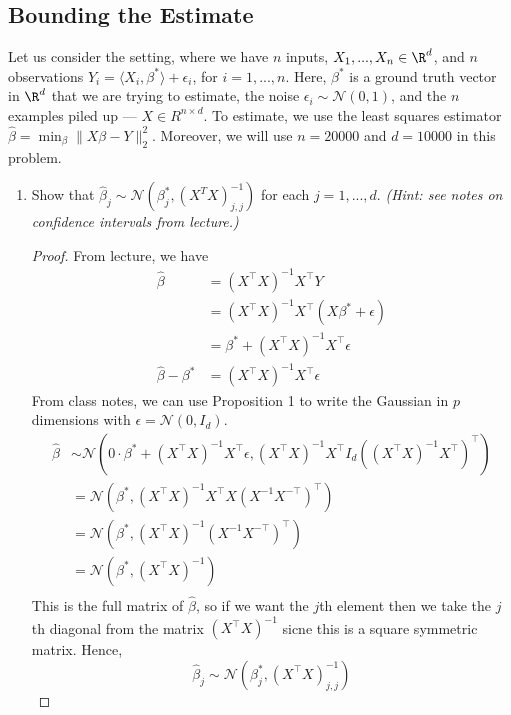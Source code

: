 \documentclass[shortlabels]{article}
\begin{document}
\subsection*{Bounding the Estimate} 
\begin{bprob}
    Let us consider the setting, where we have $n$ inputs, $X_1, ..., X_n \in \R^d$, and $n$ observations $Y_i = \langle X_i, \beta^* \rangle + \epsilon_i$, for $i = 1, ..., n$. Here, $\beta^*$ is a ground truth vector in $\R^d$ that we are trying to estimate, the noise $\epsilon_i \sim \mathcal{N}(0, 1)$, and the $n$ examples piled up --- $X \in R^{n\times d}$. To estimate, we use the least squares estimator $\widehat{\beta} = \min_\beta \lVert X\beta - Y\rVert_2^2$. Moreover, we will use $n=20000$ and $d=10000$ in this problem.

    \begin{enumerate}
        \item {} Show that $\widehat{\beta}_j \sim \mathcal{N}(\beta_j^*, (X^T X)^{-1}_{j, j})$ for each $j = 1, ..., d$. \emph{(Hint: see notes on confidence intervals from lecture.)}
        \begin{proof}
            From lecture, we have
            \begin{align*}
                \widehat{\beta} &= (X^\top X)^{-1} X^\top Y \\
                &= (X^\top X)^{-1} X^\top (X \beta^* + \epsilon ) \\
                &= \beta^*  + (X^\top X)^{-1} X^\top \epsilon \\
                \widehat{\beta} - \beta^* &= (X^\top X)^{-1} X^\top \epsilon
            \end{align*}
            From class notes, we can use Proposition 1 to write the Gaussian in $p$ dimensions with $ \epsilon = \mathcal{N}(0,I_d)$.
            \begin{align*}
                \widehat{\beta} &\sim \mathcal{N}(0 \cdot \beta^*  + (X^\top X)^{-1} X^\top \epsilon,  (X^\top X)^{-1} X^\top I_d ((X^\top X)^{-1} X^\top)^\top ) \\
                &= \mathcal{N}( \beta^*, (X^\top X)^{-1} X^\top X (X^{-1} X^{-\top} )^\top )\\
                & = \mathcal{N}( \beta^*, (X^\top X)^{-1} (X^{-1} X^{-\top} )^\top )\\
                & = \mathcal{N}( \beta^*, (X^{\top} X)^{-1} ) \\
            \end{align*}
            This is the full matrix of $\widehat{\beta}$, so if we want the $j$th element then we take the $j$th diagonal from the matrix $(X^\top X)^{-1}$ sicne this is a square symmetric matrix. Hence,
            $$ \widehat{\beta}_j \sim \mathcal{N} (\beta^*_j, (X^\top X)^{-1}_{j,j}) $$


\end{proof}
\end{enumerate}
\end{bprob}
\end{document}
